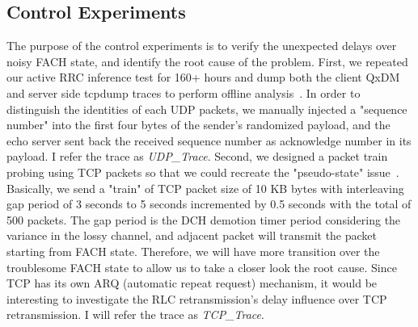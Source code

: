 \subsection{Control Experiments}

The purpose of the control experiments is to verify the unexpected delays over noisy FACH state, and identify the root cause of the problem. First, we repeated our active RRC inference test for 160+ hours and dump both the client QxDM and server side tcpdump traces to perform offline analysis~\cite{tcpdump}. In order to distinguish the identities of each UDP packets, we manually injected a "sequence number" into the first four bytes of the sender's randomized payload, and the echo server sent back the received sequence number as acknowledge number in its payload. I refer the trace as \emph{UDP\_{}Trace}. Second, we designed a packet train probing using TCP packets so that we could recreate the "pseudo-state" issue~\cite{pkt.train}. Basically, we send a "train" of TCP packet size of 10 KB bytes with interleaving gap period of 3 seconds to 5 seconds incremented by 0.5 seconds with the total of 500 packets. The gap period is the DCH demotion timer period considering the variance in the lossy channel, and adjacent packet will transmit the packet starting from FACH state. Therefore, we will have more transition over the troublesome FACH state to allow us to take a closer look the root cause. Since TCP has its own ARQ (automatic repeat request) mechanism, it would be interesting to investigate the RLC retransmission's delay influence over TCP retransmission. I will refer the trace as \emph{TCP\_{}Trace}.

\label{sec:measure}

